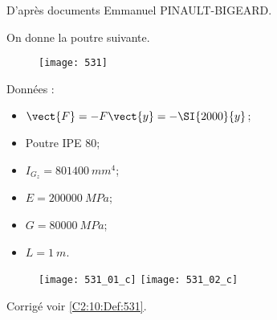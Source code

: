 \normaltrue
\correctionfalse


\setcounter{question}{0}

\begin{flushright}
\footnotesize{D'après documents Emmanuel PINAULT-BIGEARD.}
\end{flushright}


\ifcorrection
\else
{}
\fi

On donne la poutre suivante. 

\begin{figure}[H]
\centering
\texttt{[image: 531]}
\end{figure}

Données : 
\begin{itemize}
\item $\vect{F}=-F\vect{y}=-\SI{2000}{y}$;
\item Poutre IPE 80;
\item $I_{G_z} = \SI{801400}{mm^4}$;
\item $E = \SI{200000}{MPa}$;
\item $G = \SI{80000}{MPa}$;
\item $L= \SI{1}{m}$.
\end{itemize}

\ifprof
\else
\fi

\ifprof
\else
\fi



\ifprof
\begin{figure}[H]
\centering
\texttt{[image: 531\_01\_c]}
\texttt{[image: 531\_02\_c]}
\end{figure}
\else

\begin{flushright}
\footnotesize{Corrigé  voir \ref{C2:10:Def:531}.}
\end{flushright}%
\fi